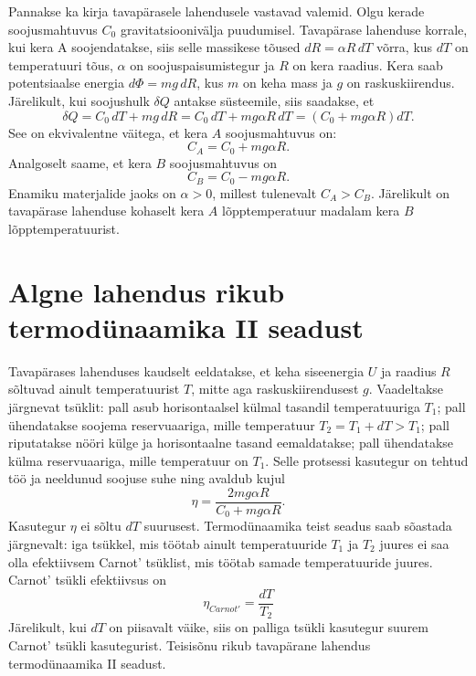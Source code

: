 \documentclass{trkut}%
\begin{document}
Pannakse ka kirja tavapärasele lahendusele vastavad valemid. Olgu kerade soojusmahtuvus $C_0$ gravitatsioonivälja puudumisel. Tavapärase lahenduse korrale, kui kera A soojendatakse, siis selle massikese tõused $dR=\alpha R \, dT$ võrra, kus $dT$ on temperatuuri tõus, $\alpha$ on soojuspaisumistegur ja $R$ on kera raadius. Kera saab potentsiaalse energia $d\Phi = mg \, dR$, kus $m$ on keha mass ja $g$ on raskuskiirendus. Järelikult, kui soojushulk \(\delta Q\) antakse süsteemile, siis saadakse, et \parencite[2-3]{palma15}
\begin{equation}
    \delta Q = C_0 \, dT + mg \, dR = C_0 \, dT + mg\alpha R \, dT = (C_0 +  mg\alpha R) dT.
\end{equation}
See on ekvivalentne väitega, et kera \(A\) soojusmahtuvus on:
\begin{equation}
    C_A = C_0 + mg\alpha R.
\end{equation}
Analgoselt saame, et kera \(B\) soojusmahtuvus on
\begin{equation}
    C_B = C_0 - mg\alpha R.
\end{equation}
Enamiku materjalide jaoks on \(\alpha > 0\), millest tulenevalt \(C_A>C_B\). Järelikult on tavapärase lahenduse kohaselt kera \(A\) lõpptemperatuur madalam kera \(B\) lõpptemperatuurist.

\section{Algne lahendus rikub termodünaamika II seadust}

Tavapärases lahenduses kaudselt eeldatakse, et keha siseenergia \(U\) ja raadius \(R\) sõltuvad ainult temperatuurist \(T\), mitte aga raskuskiirendusest \(g\). Vaadeltakse järgnevat tsüklit: pall asub horisontaalsel külmal tasandil temperatuuriga \(T_1\); pall ühendatakse soojema reservuaariga, mille temperatuur \(T_2=T_1+dT>T_1\); pall riputatakse nööri külge ja horisontaalne tasand eemaldatakse; pall ühendatakse külma reservuaariga, mille temperatuur on \(T_1\). Selle protsessi kasutegur on tehtud töö ja neeldunud soojuse suhe ning avaldub kujul \parencite[3-5]{palma15}
\begin{equation}
    \eta = \frac{2mg\alpha R}{C_0+mg\alpha R}.
\end{equation}
Kasutegur \(\eta\) ei sõltu \(dT\) suurusest. Termodünaamika teist seadus saab sõastada järgnevalt: iga tsükkel, mis töötab ainult temperatuuride \(T_1\) ja \(T_2\) juures ei saa olla efektiivsem Carnot' tsüklist, mis töötab samade temperatuuride juures. Carnot' tsükli efektiivsus on \parencite[3-5]{palma15}
\begin{equation}
    \eta_{Carnot'} = \frac{dT}{T_2}
\end{equation}
Järelikult, kui \(dT\) on piisavalt väike, siis on palliga tsükli kasutegur suurem Carnot' tsükli kasutegurist. Teisisõnu rikub tavapärane lahendus termodünaamika II seadust.
\end{document}

